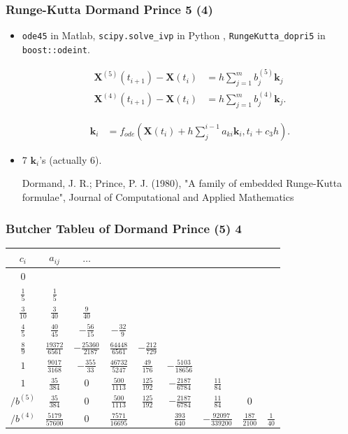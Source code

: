 \documentclass{beamer}
\begin{document}
\begin{frame}
\frametitle{Runge-Kutta Dormand Prince 5 (4)}

\begin{itemize}
\item <1->\lstinline{ode45} in Matlab, \lstinline{scipy.solve_ivp} in Python , \lstinline{RungeKutta_dopri5} in \lstinline{boost::odeint}.

\begin{align*}
\mathbf{X}^{(5)}(t_{i+1})-\mathbf{X}(t_{i}) &=  h \sum_{j=1}^{m} b_j^{(5)} \mathbf{k}_j\\
\mathbf{X}^{(4)}(t_{i+1})-\mathbf{X}(t_{i}) &=  h \sum_{j=1}^{m} b_j^{(4)} \mathbf{k}_j.
\end{align*}

\begin{align*}
\mathbf{k}_i &= f_{ode}(\mathbf{X}(t_i)+h \sum_j^{i-1} a_{ki} \mathbf{k}_i,t_i+c_3 h).
\end{align*}

\item <2-> 7 $\mathbf{k}_i$'s (actually 6).

{\color{gray} Dormand, J. R.; Prince, P. J. (1980), "A family of embedded Runge-Kutta formulae", Journal of Computational and Applied Mathematics}
\end{itemize}
\end{frame}

\begin{frame}
\frametitle{Butcher Tableu of Dormand Prince (5) 4}
\begin{tabular}{c | @{\quad} c @{\quad} c @{\quad} c @{\quad} c @{\quad} c @{\quad} c @{\quad} c @{\quad} c}
$c_i$ & $a_{ij}$ & $\hdots$\\
\midrule
$0$ \\
$\frac{1}{5}$ & $\frac{1}{5}$\\
$\frac{3}{10}$ & $\frac{3}{40}$ &  $\frac{9}{40}$\\
$\frac{4}{5}$ & $\frac{40}{45}$ &  $-\frac{56}{15}$  &  $-\frac{32}{9}$\\
$\frac{8}{9}$ & $\frac{19372}{6561}$ & $-\frac{25360}{2187}$ & $\frac{64448}{6561}$ & $-\frac{212}{729}$\\
$1$ & $\frac{9017}{3168}$ & $-\frac{355}{33}$ & $\frac{46732}{5247}$ & $\frac{49}{176}$  & $-\frac{5103}{18656}$\\
$1$ & $\frac{35}{384}$  & $0$	 & $\frac{500}{1113}$ & $\frac{125}{192}$ & $-\frac{2187}{6784}$ & $\frac{11}{84}$\\
\midrule
$/b^{(5)}$  & $\frac{35}{384}$ & $0$ & $\frac{500}{1113}$ & $\frac{125}{192}$ & $-\frac{2187}{6784}$ & $\frac{11}{84}$ & $0$\\
$/b^{(4)}$ & $\frac{5179}{57600}$ & $0$ & $\frac{7571}{16695}$ & & $\frac{393}{640}$ & $-\frac{92097}{339200}$& $\frac{187}{2100}$ & $\frac{1}{40}$
\end{tabular}
\end{frame}
\end{document}
